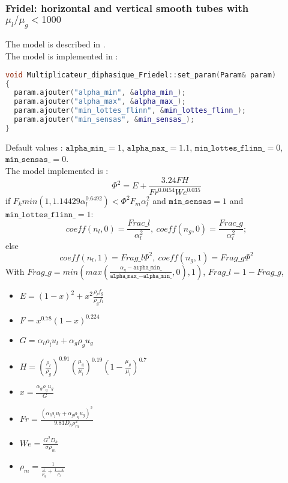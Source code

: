 \subsubsection{Fridel: horizontal and vertical smooth tubes with $\mu_l/\mu_g<1000$ }
The model is described in \textcite{friedel1979improved}.\\
The model is implemented in :
\begin{lstlisting}[language=c++]
void Multiplicateur_diphasique_Friedel::set_param(Param& param)
{
  param.ajouter("alpha_min", &alpha_min_);
  param.ajouter("alpha_max", &alpha_max_);
  param.ajouter("min_lottes_flinn", &min_lottes_flinn_);
  param.ajouter("min_sensas", &min_sensas_);
}
\end{lstlisting}
Default values : $\texttt{alpha\_min\_} = 1$, $\texttt{alpha\_max\_} = 1.1$, $\texttt{min\_lottes\_flinn\_} = 0$, $\texttt{min\_sensas\_} = 0$.\\
The model implemented is :
\begin{equation}
   \Phi^2= E+\frac{3.24FH}{Fr^{0.0454}We^{0.035}} 
\end{equation}
if $F_k min(1,1.14429\alpha_l^{0.6492}) < \Phi^2 F_m \alpha_l^2$ and $\texttt{min\_sensas}=1$ and $\texttt{min\_lottes\_flinn\_}=1$: 
\begin{equation}
    coeff(n_l, 0) = \frac{Frac\_l}{\alpha_l^2},\ coeff(n_g, 0) = \frac{Frac\_g}{\alpha_l^2};
\end{equation}
else 
\begin{equation}
    coeff(n_l, 1) = Frag\_l\Phi^2,\ coeff(n_g, 1) = Frag\_g\Phi^2
\end{equation}
With $Frag\_g=min(max(\frac{\alpha_g-\texttt{alpha\_min\_}}{\texttt{alpha\_max\_}-\texttt{alpha\_min\_}},0),1)$, $Frag\_l=1-Frag\_g$,
\begin{itemize}
    \item[\small \textcolor{blue}{\ding{109}}]$E=(1-x)^2+x^2\frac{\rho_lf_g}{\rho_gf_l}$
    \item[\small \textcolor{blue}{\ding{109}}]$F=x^{0.78}(1-x)^{0.224}$
    \item[\small \textcolor{blue}{\ding{109}}]$G=\alpha_l\rho_lu_l+\alpha_g\rho_gu_g$
    \item[\small \textcolor{blue}{\ding{109}}]$H=(\frac{\rho_l}{\rho_g})^{0.91}(\frac{\mu_g}{\mu_l})^{0.19}(1-\frac{\mu_g}{\mu_l})^{0.7}$
    \item[\small \textcolor{blue}{\ding{109}}]$x=\frac{\alpha_g \rho_gu_g}{G}$
    \item[\small \textcolor{blue}{\ding{109}}]$Fr=\frac{(\alpha_l\rho_lu_l+\alpha_g \rho_gu_g)^2}{9.81D_h\rho_m^2}$
    \item[\small \textcolor{blue}{\ding{109}}]$We=\frac{G^2D_h}{\sigma \rho_m}$
    \item[\small \textcolor{blue}{\ding{109}}]$\rho_m=\frac{1}{\frac{x}{\rho_g}+\frac{1-x}{\rho_l}}$
\end{itemize}

